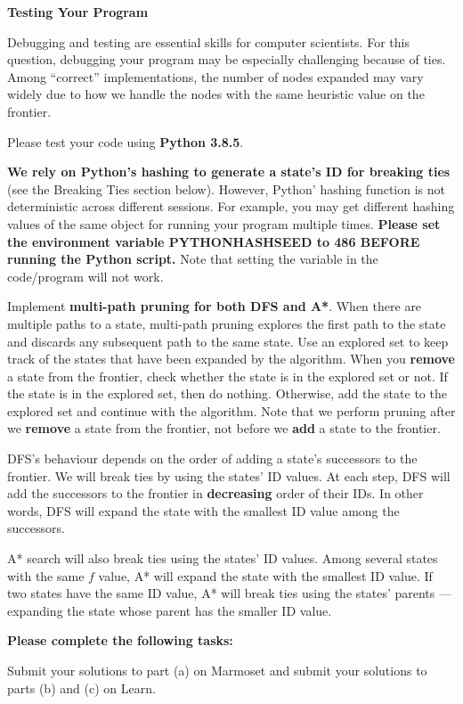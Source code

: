 \documentclass[12pt]{article}
\begin{document}
{\bf Testing Your Program}

Debugging and testing are essential skills for computer scientists. For this question, debugging your program may be especially challenging because of ties. Among ``correct'' implementations, the number of nodes expanded may vary widely due to how we handle the nodes with the same heuristic value on the frontier. 

Please test your code using {\bf Python 3.8.5}. 

{\bf We rely on Python's hashing to generate a state's ID for breaking ties} (see the Breaking Ties section below). However, Python' hashing function is not deterministic across different sessions. For example, you may get different hashing values of the same object for running your program multiple times. {\bf Please set the environment variable PYTHONHASHSEED to 486 BEFORE running the Python script.} Note that setting the variable in the code/program will not work.

Implement {\bf multi-path pruning for both DFS and A*}. When there are multiple paths to a state, multi-path pruning explores the first path to the state and discards any subsequent path to the same state. Use an explored set to keep track of the states that have been expanded by the algorithm. When you {\bf remove} a state from the frontier, check whether the state is in the explored set or not. If the state is in the explored set, then do nothing. Otherwise, add the state to the explored set and continue with the algorithm. Note that we perform pruning after we {\bf remove} a state from the frontier, not before we {\bf add} a state to the frontier.

DFS's behaviour depends on the order of adding a state's successors to the frontier. We will break ties by using the states' ID values. At each step, DFS will add the successors to the frontier in {\bf decreasing} order of their IDs. In other words, DFS will expand the state with the smallest ID value among the successors.

A* search will also break ties using the states' ID values. Among several states with the same $f$ value, A* will expand the state with the smallest ID value. If two states have the same ID value, A* will break ties using the states' parents --- expanding the state whose parent has the smaller ID value.

{\bf Please complete the following tasks:}

Submit your solutions to part (a) on Marmoset and submit your solutions to parts (b) and (c) on Learn.
\end{document}
